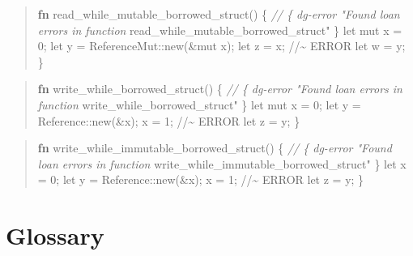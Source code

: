 \documentclass[
  11pt,
  twoside]{report}
\newenvironment{Shaded}{}{}
\newcommand{\CommentTok}[1]{\textit{#1}}
\newcommand{\KeywordTok}[1]{\textbf{#1}}
\newcommand{\NormalTok}[1]{#1}
\newcommand{\OperatorTok}[1]{#1}
\newcommand{\StringTok}[1]{#1}
\begin{document}
\begin{quote}
\begin{Shaded}
\begin{Highlighting}[]
\KeywordTok{fn}\NormalTok{ read\_while\_mutable\_borrowed\_struct() }\OperatorTok{\{}
    \CommentTok{// \{ dg{-}error "Found loan errors in function}
\NormalTok{         read\_while\_mutable\_borrowed\_struct}\StringTok{" \}}
\StringTok{    let mut x = 0;}
\StringTok{    let y = ReferenceMut::new(\&mut x);}
\StringTok{    let z = x; //\textasciitilde{} ERROR}
\StringTok{    let w = y;}
\StringTok{\}}
\end{Highlighting}
\end{Shaded}
\end{quote}

\begin{quote}
\begin{Shaded}
\begin{Highlighting}[]
\KeywordTok{fn}\NormalTok{ write\_while\_borrowed\_struct() }\OperatorTok{\{}
    \CommentTok{// \{ dg{-}error "Found loan errors in function}
\NormalTok{         write\_while\_borrowed\_struct}\StringTok{" \}}
\StringTok{    let mut x = 0;}
\StringTok{    let y = Reference::new(\&x);}
\StringTok{    x = 1; //\textasciitilde{} ERROR}
\StringTok{    let z = y;}
\StringTok{\}}
\end{Highlighting}
\end{Shaded}
\end{quote}

\begin{quote}
\begin{Shaded}
\begin{Highlighting}[]
\KeywordTok{fn}\NormalTok{ write\_while\_immutable\_borrowed\_struct() }\OperatorTok{\{}
    \CommentTok{// \{ dg{-}error "Found loan errors in function}
\NormalTok{         write\_while\_immutable\_borrowed\_struct}\StringTok{" \}}
\StringTok{    let x = 0;}
\StringTok{    let y = Reference::new(\&x);}
\StringTok{    x = 1; //\textasciitilde{} ERROR}
\StringTok{    let z = y;}
\StringTok{\}}
\end{Highlighting}
\end{Shaded}
\end{quote}

\cleardoublepage

\chapter{Glossary}\label{sec:glossary}
\end{document}
